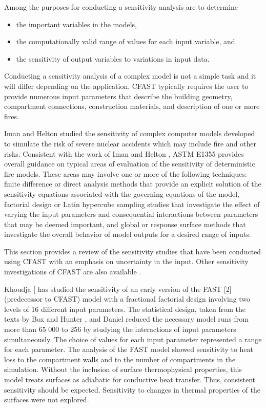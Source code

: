 Among the purposes for conducting a sensitivity analysis are to determine
\begin{itemize}
\item the important variables in the models,
\item the computationally valid range of values for each input variable, and
\item the sensitivity of output variables to variations in input data.
\end{itemize}

Conducting a sensitivity analysis of a complex model is not a simple task and it will differ depending on the application. CFAST typically requires the user to provide numerous input parameters that describe the building geometry, compartment connections, construction materials, and description of one or more fires.

Iman and Helton \cite{Iman:1988} studied the sensitivity of complex computer models developed to simulate the risk of severe nuclear accidents which may include fire and other risks. Consistent with the work of Iman and Helton \cite{Iman:1988}, ASTM E1355 \cite{ASTM:E1355} provides overall guidance on typical areas of evaluation of the sensitivity of deterministic fire models.  These areas may involve one or more of the following techniques: finite difference or direct analysis methods that provide an explicit solution of the sensitivity equations associated with the governing equations of the model, factorial design or Latin hypercube sampling studies that investigate the effect of varying the input parameters and consequential interactions between parameters that may be deemed important, and global or response surface methods that investigate the overall behavior of model outputs for a desired range of inputs.

This section provides a review of the sensitivity studies that have been conducted using CFAST
with an emphasis on uncertainty in the input. Other sensitivity investigations of CFAST are also
available \cite{Peacock:1988a, Beard:1992, Notarianni:2000}.

Khoudja [\cite{Khoudja:1988} has studied the sensitivity of an early version of the FAST [2] (predecessor to CFAST) model with a fractional factorial design involving two levels of 16 different input parameters. The statistical design, taken from the texts by Box and Hunter \cite{Box:1978}, and Daniel \cite{Daniel:1976} reduced the necessary model runs from more than 65 000 to 256 by studying the interactions of input parameters simultaneously. The choice of values for each input parameter represented a range for each parameter. The analysis of the FAST model showed sensitivity to heat loss to the compartment walls and to the number of compartments in the simulation. Without the inclusion of surface thermophysical properties, this model treats surfaces as adiabatic for conductive heat transfer. Thus, consistent sensitivity should be expected. Sensitivity to changes in thermal properties of the surfaces were not explored.

